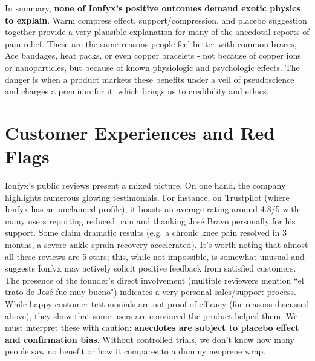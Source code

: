 \documentclass{article}
\begin{document}
In summary, \textbf{none of Ionfyx's positive outcomes demand exotic physics to explain}. Warm compress effect, support/compression, and placebo suggestion together provide a very plausible explanation for many of the anecdotal reports of pain relief. These are the same reasons people feel better with common braces, Ace bandages, heat packs, or even copper bracelets - not because of copper ions or nanoparticles, but because of known physiologic and psychologic effects. The danger is when a product markets these benefits under a veil of pseudoscience and charges a premium for it, which brings us to credibility and ethics.

\section{Customer Experiences and Red Flags}

Ionfyx's public reviews present a mixed picture. On one hand, the company highlights numerous glowing testimonials. For instance, on Trustpilot (where Ionfyx has an unclaimed profile), it boasts an average rating around 4.8/5 with many users reporting reduced pain and thanking José Bravo personally for his support. Some claim dramatic results (e.g. a chronic knee pain resolved in 3 months, a severe ankle sprain recovery accelerated). It's worth noting that almost all these reviews are 5-stars; this, while not impossible, is somewhat unusual and suggests Ionfyx may actively solicit positive feedback from satisfied customers. The presence of the founder's direct involvement (multiple reviewers mention “el trato de José fue muy bueno") indicates a very personal sales/support process. While happy customer testimonials are not proof of efficacy (for reasons discussed above), they show that some users are convinced the product helped them. We must interpret these with caution: \textbf{anecdotes are subject to placebo effect and confirmation bias}. Without controlled trials, we don't know how many people saw no benefit or how it compares to a dummy neoprene wrap.
\end{document}
